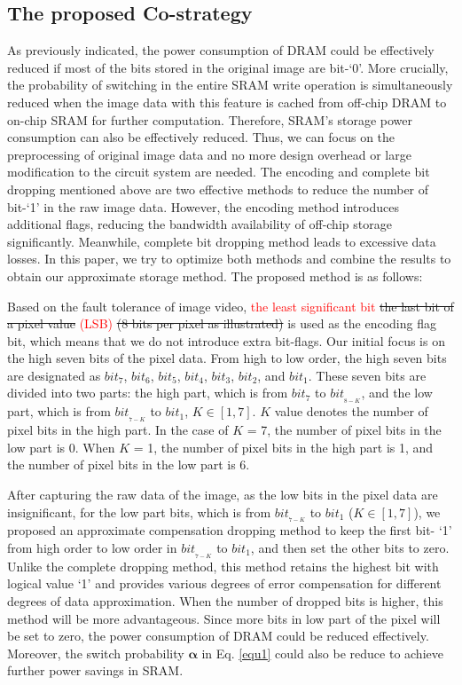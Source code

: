 \documentclass[lettersize,journal]{IEEEtran}
\begin{document}
{\color{red}\subsection{The proposed Co-strategy}}
As previously indicated, the power consumption of DRAM could be effectively reduced if most of the bits stored in the original image are bit-`0'. More crucially, the probability of switching in the entire SRAM write operation is simultaneously reduced when the image data with this feature is cached from off-chip DRAM to on-chip SRAM for further computation. Therefore, SRAM’s storage power consumption can also be effectively reduced. Thus, we can focus on the preprocessing of original image data and no more design overhead or large modification to the circuit system are needed. The encoding and complete bit dropping mentioned above are two effective methods to reduce the number of bit-`1' in the raw image data. However, the encoding method introduces additional flags, reducing the bandwidth availability of off-chip storage significantly. Meanwhile, complete bit dropping method leads to excessive data losses. In this paper, we try to optimize both methods and combine the results to obtain our approximate storage method. The proposed method is as follows:

Based on the fault tolerance of image video, \textcolor{red}{the least significant bit} {\color{red}\sout{the last bit of a pixel value}} \textcolor{red}{(LSB)} {\color{red}\sout{(8 bits per pixel as illustrated)}} is used as the encoding flag bit, which means that we do not introduce extra bit-flags. Our initial focus is on the high seven bits of the pixel data. From high to low order, the high seven bits are designated as $bit_7$, $bit_6$, $bit_5$, $bit_4$, $bit_3$, $bit_2$, and $bit_1$. These seven bits are divided into two parts: the high part, which is from $bit_7$ to $bit_{_{8-K}}$, and the low part, which is from $bit_{_{7-K}}$ to $bit_1$, $K \in [1,7]$. $K$ value denotes the number of pixel bits in the high part. In the case of $K$ = 7, the number of pixel bits in the low part is 0. When $K$ = 1, the number of pixel bits in the high part is 1, and the number of pixel bits in the low part is 6.


After capturing the raw data of the image, as the low bits in the pixel data are insignificant, for the low part bits, which is from $bit_{_{7-K}}$ to $bit_1$ ($K \in [1,7]$), we proposed an approximate compensation dropping method to keep the first bit- `1' from high order to low order in $bit_{_{7-K}}$ to $bit_1$, and then set the other bits to zero. Unlike the complete dropping method, this method retains the highest bit with logical value `1' and provides various degrees of error compensation for different degrees of data approximation. When the number of dropped bits is higher, this method will be more advantageous. Since more bits in low part of the pixel will be set to zero, the power consumption of DRAM could be reduced effectively. Moreover, the switch probability $\boldsymbol{\alpha}$ in Eq. \eqref{equ1} could also be reduce to achieve further power savings in SRAM.
\end{document}
